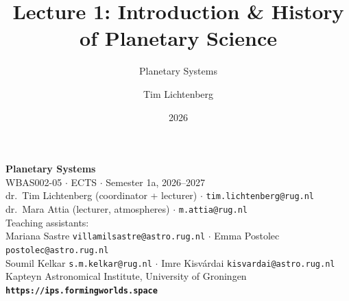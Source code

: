 \documentclass[aspectratio=169, 11pt]{beamer}
\title[L1: Introduction \& History]{Lecture 1: Introduction \& History\\of Planetary Science}
\subtitle{Planetary Systems}
\author[T.~Lichtenberg]{Tim Lichtenberg}
\institute{Kapteyn Astronomical Institute\\University of Groningen}
\date{2026}
\begin{document}
\begin{frame}
  \vfill
  \begin{center}
    {\color{white}\Huge\bfseries Planetary Systems}\\[10pt]
    {\color{white!90}\large WBAS002-05 \;$\cdot$ ECTS \;$\cdot$\; Semester 1a, 2026--2027}\\[22pt]
    {\color{white!90} dr.\ Tim Lichtenberg (coordinator + lecturer) \;$\cdot$\; \texttt{tim.lichtenberg@rug.nl}}\\[4pt]
    {\color{white!90} dr.\ Mara Attia (lecturer, atmospheres) \;$\cdot$\; \texttt{m.attia@rug.nl}}\\[12pt]
    {\color{white!85}\small Teaching assistants:}\\[3pt]
    {\color{white!80}\footnotesize Mariana Sastre \texttt{villamilsastre@astro.rug.nl} \;$\cdot$\; Emma Postolec \texttt{postolec@astro.rug.nl}}\\[2pt]
    {\color{white!80}\footnotesize Soumil Kelkar \texttt{s.m.kelkar@rug.nl} \;$\cdot$\; Imre Kisvárdai \texttt{kisvardai@astro.rug.nl}}\\[14pt]
    {\color{white!80}\small Kapteyn Astronomical Institute, University of Groningen}\\[10pt]
    {\color{white}\normalsize\bfseries\texttt{https://ips.formingworlds.space}}
  \end{center}
  \vfill
\end{frame}
\end{document}
